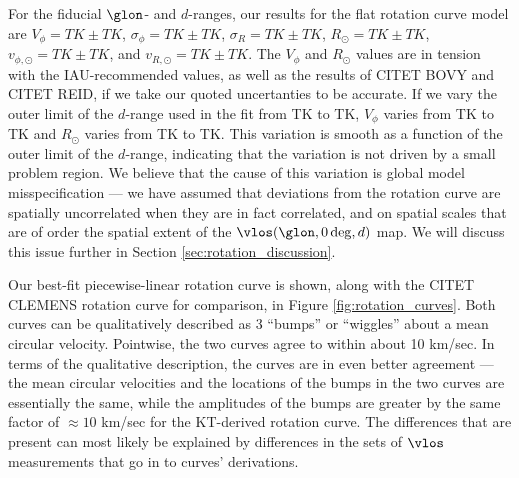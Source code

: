 For the fiducial $\glon$- and $d$-ranges, our results for the flat rotation curve model are $V_\phi=TK \pm TK$, $\sigma_\phi = TK \pm TK$, $\sigma_R = TK \pm TK$, $R_\odot = TK \pm TK$, $v_{\phi, \odot} = TK \pm TK$, and $v_{R, \odot} = TK \pm TK$.
The $V_\phi$ and $R_{\odot}$ values are in tension with the IAU-recommended values, as well as the results of CITET BOVY and CITET REID, if we take our quoted uncertanties to be accurate. 
If we vary the outer limit of the $d$-range used in the fit from TK to TK, $V_\phi$ varies from TK to TK and $R_\odot$ varies from TK to TK. 
This variation is smooth as a function of the outer limit of the $d$-range, indicating that the variation is not driven by a small problem region.
We believe that the cause of this variation is global model misspecification --- we have assumed that deviations from the rotation curve are spatially uncorrelated when they are in fact correlated, and on spatial scales that are of order the spatial extent of the $\vlos(\glon, 0\deg, d)$ map.
We will discuss this issue further in Section \ref{sec:rotation_discussion}. 

Our best-fit piecewise-linear rotation curve is shown, along with the CITET CLEMENS rotation curve for comparison, in Figure \ref{fig:rotation_curves}. 
Both curves can be qualitatively described as 3 ``bumps'' or ``wiggles'' about a mean circular velocity. 
Pointwise, the two curves agree to within about 10 km/sec. 
In terms of the qualitative description, the curves are in even better agreement --- the mean circular velocities and the locations of the bumps in the two curves are essentially the same, while the amplitudes of the bumps are greater by the same factor of $\approx 10$ km/sec for the KT-derived rotation curve.
The differences that are present can most likely be explained by differences in the sets of $\vlos$ measurements that go in to curves' derivations. 



